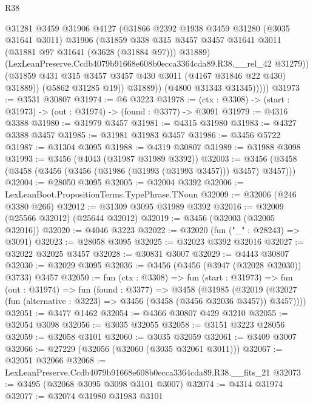 \begin{lexlean}{R38}
\begin{coremodule}
                    @31281
                    @3459
                    @31906
                    @4127
                    (@31866
                      @2392
                      @1938
                      @3459
                      @31280
                      (@3035 @31641 @3011)
                      @31906
                      (@31859
                        @338
                        @315
                        @3457
                        @3457
                        @31641
                        @3011
                        (@31881 @97 @31641 (@3628 (@31884 @97)))
                        @31889)
                      (LexLeanPreserve.Ccdb4079b91668e608b0ecca3364cda89.R38.__rel_42 @31279))
                    (@31859 @431 @315 @3457 @3457 @430 @3011 (@4167 @31846 @22 @430) @31889))
                  (@5862 @31285 @19))
                @31889))
            (@4800 @31343 @31345)))))
@31973 := @3531 @30807
@31974 := @6 @3223
@31978 := (ctx : @3308) -> (start : @31973) -> (out : @31974) -> (found : @3377) -> @3091
@31979 := @4316 @3388
@31980 := @31979 @3457
@31981 := @4315 @31980
@31983 := @4327 @3388 @3457
@31985 := @31981 @31983 @3457
@31986 := @3456 @5722
@31987 := @31304 @3095
@31988 := @4319 @30807
@31989 := @31988 @3098
@31993 := @3456 (@4043 (@31987 @31989 @3392))
@32003 := @3456 (@3458 (@3458 (@3456 (@3456 (@31986 (@31993 (@31993 @3457))) @3457) @3457)))
@32004 := @28050 @3095
@32005 := @32004 @3392
@32006 := LexLeanBoot.PropositionTerms.TypePhrase.TNoun
@32009 := @32006 (@246 @3380 @266)
@32012 := @31309 @3095 @31989 @3392
@32016 := @32009 (@25566 @32012) (@25644 @32012)
@32019 := @3456 (@32003 (@32005 @32016))
@32020 := @4046 @3223
@32022 := @32020 (fun ("_" : @28243) => @3091)
@32023 := @28058 @3095
@32025 := @32023 @3392 @32016
@32027 := @32022 @32025 @3457
@32028 := @30831 @3007
@32029 := @4443 @30807
@32030 := @32029 @3095
@32036 := @3456 (@3456 (@3947 (@32028 @32030)) @3733) @3457
@32050 := fun (ctx : @3308) =>
  fun (start : @31973) =>
  fun (out : @31974) =>
  fun (found : @3377) =>
  @3458
    (@31985
      (@32019 (@32027 (fun (alternative : @3223) => @3456 (@3458 (@3456 @32036 @3457)) @3457))))
@32051 := @3477 @1462
@32054 := @4366 @30807 @429 @3210
@32055 := @32054 @3098
@32056 := @3035 @32055
@32058 := @3151 @3223 @28056
@32059 := @32058 @3101
@32060 := @3035 @32059
@32061 := @3409 @3007
@32066 := @27229 (@32056 (@32060 (@3035 @32061 @3011)))
@32067 := @32051 @32066
@32068 := LexLeanPreserve.Ccdb4079b91668e608b0ecca3364cda89.R38.__fits_21
@32073 := @3495 (@32068 @3095 @3098 @3101 @3007)
@32074 := @4314 @31974
@32077 := @32074 @31980 @31983 @3101

\end{coremodule}
\end{lexlean}
